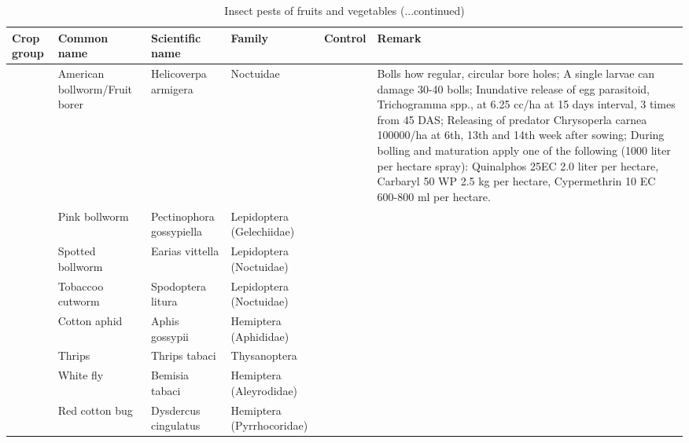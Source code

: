\documentclass[10pt,dvipsnames,ignorenonframetext,aspectratio=169]{beamer}
\begin{document}
\begin{frame}{}
\protect\hypertarget{section-24}{}
\begin{table}

\caption{\label{tab:unnamed-chunk-6}Insect pests of fruits and vegetables (...continued)}
\centering
\fontsize{4}{6}\selectfont
\begin{tabular}[t]{>{\raggedright\arraybackslash}p{5em}>{\raggedright\arraybackslash}p{10em}>{\raggedright\arraybackslash}p{15em}>{\raggedright\arraybackslash}p{12em}>{\raggedright\arraybackslash}p{6em}>{\raggedright\arraybackslash}p{22em}}
\toprule
Crop group & Common name & Scientific name & Family & Control & Remark\\
\midrule
 & American bollworm/Fruit borer & Helicoverpa armigera & Noctuidae &  & Bolls how regular, circular bore holes; A single larvae can damage 30-40 bolls; Inundative release of egg parasitoid, Trichogramma spp., at 6.25 cc/ha at 15 days interval, 3 times from 45 DAS; Releasing of predator Chrysoperla carnea 100000/ha at 6th, 13th and 14th week after sowing; During bolling and maturation apply one of the following (1000 liter per hectare spray): Quinalphos 25EC 2.0 liter per hectare, Carbaryl 50 WP 2.5 kg per hectare, Cypermethrin 10 EC 600-800 ml per hectare.\\
\cmidrule{2-6}
 & Pink bollworm & Pectinophora gossypiella & Lepidoptera (Gelechiidae) &  & \\
\cmidrule{2-6}
 & Spotted bollworm & Earias vittella & Lepidoptera (Noctuidae) &  & \\
\cmidrule{2-6}
 & Tobaccoo cutworm & Spodoptera litura & Lepidoptera (Noctuidae) &  & \\
\cmidrule{2-6}
 & Cotton aphid & Aphis gossypii & Hemiptera (Aphididae) &  & \\
\cmidrule{2-6}
 & Thrips & Thrips tabaci & Thysanoptera &  & \\
\cmidrule{2-6}
 & White fly & Bemisia tabaci & Hemiptera (Aleyrodidae) &  & \\
\cmidrule{2-6}
\multirow{-8}{5em}{\raggedright\arraybackslash Cotton} & Red cotton bug & Dysdercus cingulatus & Hemiptera (Pyrrhocoridae) &  & \\
\bottomrule
\end{tabular}
\end{table}
\end{frame}
\end{document}
